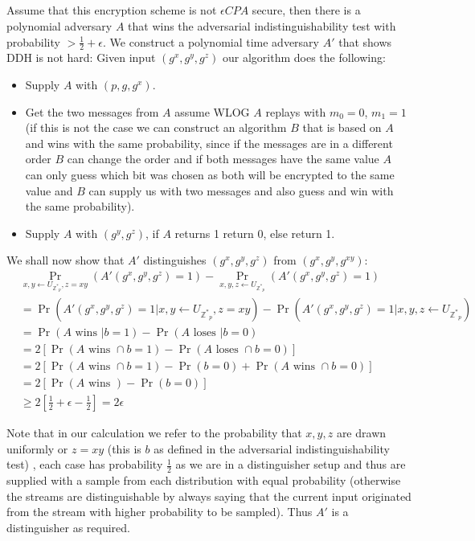 \documentclass{article}
\begin{document}
\subsection{} %
Assume that this encryption scheme is not $\epsilon CPA$ secure, then there is a polynomial adversary $A$ that wins the adversarial indistinguishability test with probability $ > \frac{1}{2} + \epsilon$.
We construct a polynomial time adversary $A'$ that shows DDH is not hard:
Given input $(g^x,g^y,g^z)$ our algorithm does the following:
\begin{itemize}
\item Supply $A$ with $(p, g, g^x)$.
\item Get the two messages from $A$ assume WLOG $A$ replays with $m_0 = 0$, $m_1 = 1$ (if this is not the case we can construct an algorithm $B$ that is based on $A$ and wins with the same probability, since if the messages are in a different order $B$ can change the order and if both messages have the same value $A$ can only guess which bit was chosen as both will be encrypted to the same value and $B$ can supply us with two messages and also guess and win with the same probability).
\item Supply $A$ with $(g^y, g^z)$, if $A$ returns 1 return 0, else return 1.  
\end{itemize}
We shall now show that $A'$ distinguishes $(g^x,g^y,g^z)$ from $(g^x,g^y,g^{xy})$:
\begin{align*}
&\Pr_{x,y \leftarrow U_{\mathbb{Z^*}_{p}}, z= xy}(A'(g^x, g^y, g^{z}) = 1) - \Pr_{x,y,z \leftarrow U_{\mathbb{Z^*}_{p}}}(A'(g^x, g^y, g^z) = 1)\\
& = \Pr(A'(g^x, g^y, g^{z}) = 1| x,y \leftarrow U_{\mathbb{Z^*}_{p}}, z= xy) - \Pr(A'(g^x, g^y, g^z) = 1| x,y,z \leftarrow U_{\mathbb{Z^*}_{p}})\\
&= \Pr(A \mbox{  wins } | b = 1) - \Pr(A \mbox{  loses }| b = 0)\\
&= 2[\Pr(A \mbox{  wins } \cap b = 1) - \Pr(A \mbox{  loses }\cap b = 0)]\\
&= 2[\Pr(A \mbox{  wins } \cap b = 1) - \Pr(b = 0) + \Pr(A \mbox{  wins }\cap b = 0)]\\
&= 2[\Pr(A \mbox{  wins }) - \Pr(b = 0) ]\\
&\geq 2[\frac{1}{2} + \epsilon - \frac{1}{2}] = 2\epsilon
\end{align*}

Note that in our calculation we refer to the probability that $x,y,z$ are drawn uniformly or $z=xy$ (this is $b$ as defined in the adversarial indistinguishability test) , each case has probability $\frac{1}{2}$ as we are in a distinguisher setup and thus are supplied with a sample from each distribution with equal probability (otherwise the streams are distinguishable by always saying that the current input originated from the stream with higher probability to be sampled).
Thus $A'$ is a distinguisher as required.
\end{document}
